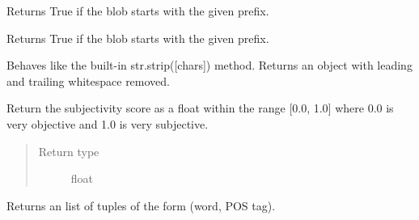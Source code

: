 \documentclass[letterpaper,10pt,english]{sphinxmanual}
\begin{document}
\begin{fulllineitems}
\begin{fulllineitems}
\label{api_reference:textblob_de.blob.BaseBlob.starts_with}
Returns True if the blob starts with the given prefix.

\end{fulllineitems}


\begin{fulllineitems}
\label{api_reference:textblob_de.blob.BaseBlob.startswith}
Returns True if the blob starts with the given prefix.

\end{fulllineitems}


\begin{fulllineitems}
\label{api_reference:textblob_de.blob.BaseBlob.strip}
Behaves like the built-in str.strip({[}chars{]}) method. Returns
an object with leading and trailing whitespace removed.

\end{fulllineitems}


\begin{fulllineitems}
\label{api_reference:textblob_de.blob.BaseBlob.subjectivity}
Return the subjectivity score as a float within the range {[}0.0, 1.0{]}
where 0.0 is very objective and 1.0 is very subjective.
\begin{quote}\begin{description}
\item[{Return type}] \leavevmode
float

\end{description}\end{quote}

\end{fulllineitems}


\begin{fulllineitems}
\label{api_reference:textblob_de.blob.BaseBlob.tags}
Returns an list of tuples of the form (word, POS tag).


\end{fulllineitems}
\end{fulllineitems}
\end{document}
